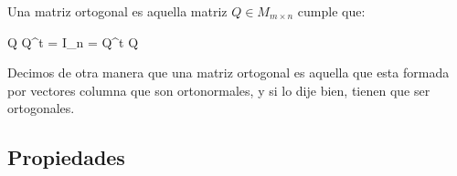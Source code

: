 \documentclass[12pt, fleqn]{report}                             %
\def \Eq {equation}                                             %
\newenvironment{MultiLineEquation*}[1]                          %
        {\begin{\Eq*}\begin{alignedat}{#1}}                         %
        {\end{alignedat}\end{\Eq*}}                                 %
\newenvironment{LargeEq} {\begingroup \Large}{\endgroup}        %
\theoremstyle{break}                                            %
\newcommand{\Color}[2]{\textcolor{#1}{#2}}                      %
\newcommand \ColorMatrixQ       {Orange700MD}                   %
\begin{document}
            Una matriz ortogonal es aquella matriz $Q \in M_{m \times n}$ cumple que:
            \begin{LargeEq}
                \begin{MultiLineEquation*}{3}
                    \Color{ \ColorMatrixQ }{
                        Q Q^t = I_n = Q^t Q
                    }                    
                \end{MultiLineEquation*}
            \end{LargeEq}

            Decimos de otra manera que una matriz ortogonal es aquella que esta formada por
            vectores columna que son ortonormales, y si lo dije bien, tienen que ser
            ortogonales.

            \vspace{1em}
            \subsection{Propiedades}
\end{document}
